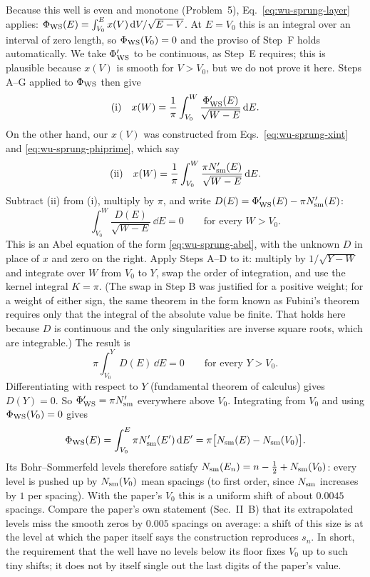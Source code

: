 Because this well is even and monotone (Problem~5), Eq.~\eqref{eq:wu-sprung-layer} applies: $\Phi_{\rm WS}(E)=\int_{V_0}^{E}x(V)\,\mathrm{d} V/\sqrt{E-V}$. At $E=V_0$ this is an integral over an interval of zero length, so $\Phi_{\rm WS}(V_0)=0$ and the proviso of Step~F holds automatically. We take $\Phi_{\rm WS}'$ to be continuous, as Step~E requires; this is plausible because $x(V)$ is smooth for $V>V_0$, but we do not prove it here. Steps A--G applied to $\Phi_{\rm WS}$ then give
\[
\text{(i)}\quad x(W)=\frac1\pi\int_{V_0}^{W}\frac{\Phi_{\rm WS}'(E)}{\sqrt{W-E}}\,\mathrm{d} E .
\]
On the other hand, our $x(V)$ was constructed from Eqs.~\eqref{eq:wu-sprung-xint} and \eqref{eq:wu-sprung-phiprime}, which say
\[
\text{(ii)}\quad x(W)=\frac1\pi\int_{V_0}^{W}\frac{\pi N_{\mathrm{sm}}'(E)}{\sqrt{W-E}}\,\mathrm{d} E .
\]
Subtract (ii) from (i), multiply by $\pi$, and write $D(E)=\Phi_{\rm WS}'(E)-\pi N_{\mathrm{sm}}'(E)$:
\[
\int_{V_0}^{W}\frac{D(E)}{\sqrt{W-E}}\,\dd E=0\qquad\text{for every }W>V_0 .
\]
This is an Abel equation of the form \eqref{eq:wu-sprung-abel}, with the unknown $D$ in place of $x$ and zero on the right. Apply Steps A--D to it: multiply by $1/\sqrt{Y-W}$ and integrate over $W$ from $V_0$ to $Y$, swap the order of integration, and use the kernel integral $K=\pi$. (The swap in Step B was justified for a positive weight; for a weight of either sign, the same theorem in the form known as Fubini's theorem requires only that the integral of the absolute value be finite. That holds here because $D$ is continuous and the only singularities are inverse square roots, which are integrable.) The result is
\[
\pi\int_{V_0}^{Y}D(E)\,\dd E=0\qquad\text{for every }Y>V_0 .
\]
Differentiating with respect to $Y$ (fundamental theorem of calculus) gives $D(Y)=0$. So $\Phi_{\rm WS}'=\pi N_{\mathrm{sm}}'$ everywhere above $V_0$. Integrating from $V_0$ and using $\Phi_{\rm WS}(V_0)=0$ gives
\begin{equation}
\Phi_{\rm WS}(E)=\int_{V_0}^{E}\pi N_{\mathrm{sm}}'(E')\,\mathrm{d} E'=\pi\bigl[N_{\mathrm{sm}}(E)-N_{\mathrm{sm}}(V_0)\bigr].
\label{eq:wu-sprung-phiws}
\end{equation}
Its Bohr--Sommerfeld levels therefore satisfy $N_{\mathrm{sm}}(E_n)=n-\tfrac12+N_{\mathrm{sm}}(V_0)$: every level is pushed up by $N_{\mathrm{sm}}(V_0)$ mean spacings (to first order, since $N_{\mathrm{sm}}$ increases by $1$ per spacing). With the paper's $V_0$ this is a uniform shift of about $0.0045$ spacings. Compare the paper's own statement (Sec.~II~B) that its extrapolated levels miss the smooth zeros by $0.005$ spacings on average: a shift of this size is at the level at which the paper itself says the construction reproduces $s_n$. In short, the requirement that the well have no levels below its floor fixes $V_0$ up to such tiny shifts; it does not by itself single out the last digits of the paper's value.

